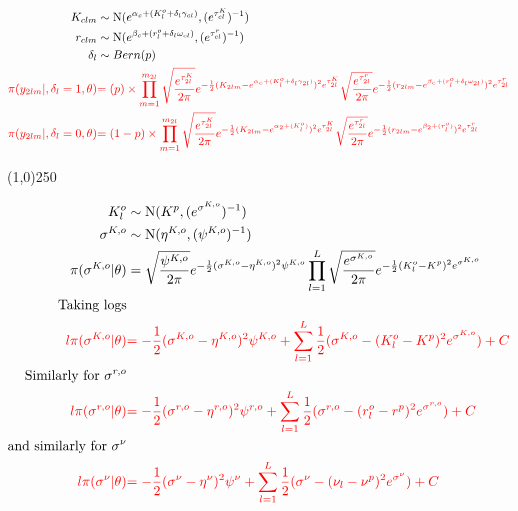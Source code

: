 \begin{align*}
K_{clm} &\sim \operatorname{N}(e^{\alpha_{c}+(K_{l}^o+\delta_{l}\gamma_{cl})},(e^{ \tau_{cl}^K })^{-1})\\
r_{clm} &\sim \operatorname{N}(e^{\beta_{c}+(r_{l}^o+\delta_{l}\omega_{cl})},(e^{ \tau_{cl}^r })^{-1})\\
\delta_{l} &\sim Bern(p)\\
\color{red}{
\pi(y_{2lm}|,\delta_{l}=1,\theta)}&
\color{red}{
=(p)\times
\prod_{m=1}^{m_{2l}}
\sqrt{\frac{e^{ \tau_{2l}^K }}{2\pi}} e^{-\frac{1}{2}(K_{2lm}-e^{\alpha_{c}+(K_{l}^o+\delta_{l}\gamma_{2l})})^{2}e^{ \tau_{2l}^K } }
\sqrt{\frac{e^{ \tau_{2l}^r }}{2\pi}} e^{-\frac{1}{2}(r_{2lm}-e^{\beta_{c}+(r_{l}^o+\delta_{l}\omega_{2l})})^{2}e^{ \tau_{2l}^r } }
}
\\
\color{red}{
\pi(y_{2lm}|,\delta_{l}=0,\theta)}&
\color{red}{
=(1-p)\times
\prod_{m=1}^{m_{2l}}
\sqrt{\frac{e^{ \tau_{2l}^K }}{2\pi}} e^{-\frac{1}{2}(K_{2lm}-e^{\alpha_{2}+(K_{l}^o)})^{2}e^{ \tau_{2l}^K } }
\sqrt{\frac{e^{ \tau_{2l}^r }}{2\pi}} e^{-\frac{1}{2}(r_{2lm}-e^{\beta_{2}+(r_{l}^o)})^{2}e^{ \tau_{2l}^r } }
}
\end{align*}

\begin{center}
\line(1,0){250}
\end{center}

\begin{align*}
K_{l}^o &\sim \operatorname{N}(K^p, (e^{ \sigma^{K,o} })^{-1} )\\
\sigma^{K,o} &\sim \operatorname{N}(\eta^{K,o}, (\psi^{K,o})^{-1} )\\
\pi(\sigma^{K,o} |\theta)&=
\sqrt{\frac{\psi^{K,o}}{2\pi}} e^{-\frac{1}{2}(\sigma^{K,o}-\eta^{K,o})^{2}\psi^{K,o} }
\prod_{l=1}^{L}
\sqrt{\frac{
e^{ \sigma^{K,o}}
}{2\pi}} e^{-\frac{1}{2}(
K_{l}^o-K^p
)^{2} 
e^{ \sigma^{K,o}}
}\\
\text{Taking logs}\\
\color{red}{l\pi(\sigma^{K,o}|\theta)}&
\color{red}{
=-\frac{1}{2}(\sigma^{K,o}-\eta^{K,o})^{2}\psi^{K,o} 
+
\sum_{l=1}^{L}\frac{1}{2}(\sigma^{K,o}-(K_{l}^o-K^p)^{2}e^{\sigma^{K,o}})
+C
}
\\
\text{Similarly for $\sigma^{r,o}$}\\
\color{red}{l\pi(\sigma^{r,o}|\theta)}&
\color{red}{
=-\frac{1}{2}(\sigma^{r,o}-\eta^{r,o})^{2}\psi^{r,o} 
+
\sum_{l=1}^{L}\frac{1}{2}(\sigma^{r,o}-(r_{l}^o-r^p)^{2}e^{\sigma^{r,o}})
+C
}
\\
\text{and similarly for $\sigma^{\nu}$}\\
\color{red}{l\pi(\sigma^{\nu}|\theta)}&
\color{red}{
=-\frac{1}{2}(\sigma^{\nu}-\eta^{\nu})^{2}\psi^{\nu} 
+
\sum_{l=1}^{L}\frac{1}{2}(\sigma^{\nu}-(\nu_{l}-\nu^p)^{2}e^{\sigma^{\nu}})
+C
}
\end{align*}